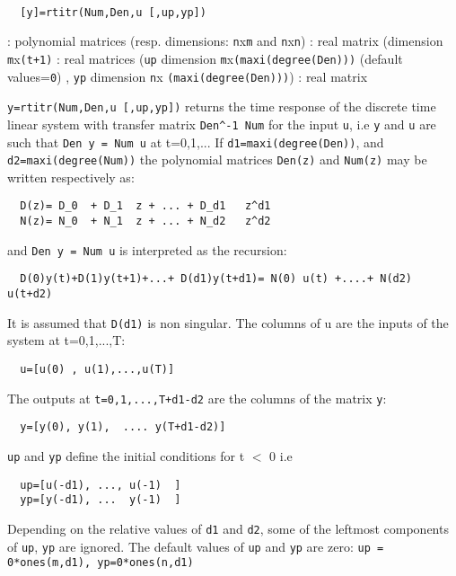 \begin{mandesc}
   \\ %
\end{mandesc}
\begin{calling_sequence}
\begin{verbatim}
  [y]=rtitr(Num,Den,u [,up,yp])  
\end{verbatim}
\end{calling_sequence}
\begin{parameters}
  \begin{varlist}
    : polynomial  matrices (resp. dimensions: \verb!n!x\verb!m! and \verb!n!x\verb!n!)
    : real matrix (dimension \verb!m!x\verb!(t+1)!
    : real matrices (\verb!up! dimension \verb!m!x\verb!(maxi(degree(Den)))! (default values=\verb!0!) ,
    \verb!yp! dimension \verb!n!x 
    \verb!(maxi(degree(Den)))!)
    : real matrix
  \end{varlist}
\end{parameters}
\begin{mandescription}
  \verb!y=rtitr(Num,Den,u [,up,yp])! returns the time response of
  the discrete time linear system with transfer matrix \verb!Den^-1 Num! 
  for the input \verb!u!, i.e \verb!y! and \verb!u! are such that \verb!Den y = Num u! at t=0,1,...
  If \verb!d1=maxi(degree(Den))!, and \verb!d2=maxi(degree(Num))! the polynomial 
  matrices  \verb!Den(z)! and \verb!Num(z)! may be written respectively as:
\begin{verbatim}
  D(z)= D_0  + D_1  z + ... + D_d1   z^d1
  N(z)= N_0  + N_1  z + ... + N_d2   z^d2
\end{verbatim}
and \verb!Den y = Num u! is interpreted as the recursion:
\begin{verbatim}
  D(0)y(t)+D(1)y(t+1)+...+ D(d1)y(t+d1)= N(0) u(t) +....+ N(d2) u(t+d2)
\end{verbatim}
It is assumed that \verb!D(d1)! is non singular.
The columns of u are the inputs of the system at t=0,1,...,T:
\begin{verbatim}
  u=[u(0) , u(1),...,u(T)]
\end{verbatim}
The outputs at \verb!t=0,1,...,T+d1-d2! are the columns of the matrix \verb!y!:
\begin{verbatim}
  y=[y(0), y(1),  .... y(T+d1-d2)]
\end{verbatim}
\verb!up! and \verb!yp! define the initial conditions for t $<$ 0 i.e
\begin{verbatim}
  up=[u(-d1), ..., u(-1)  ]
  yp=[y(-d1), ...  y(-1)  ]
\end{verbatim}
Depending on the relative values of \verb!d1! and \verb!d2!, some of the
leftmost components of \verb!up!, \verb!yp! are ignored.
The default values of \verb!up! and \verb!yp! are zero:
\verb!up = 0*ones(m,d1), yp=0*ones(n,d1)!
\end{mandescription}
